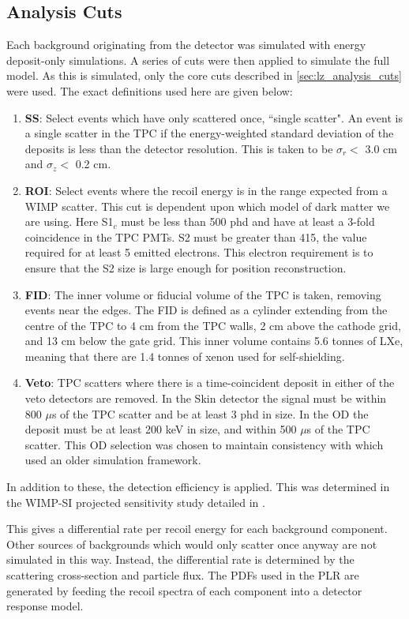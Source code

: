 

\subsection{Analysis Cuts}
\par
Each background originating from the detector was simulated with energy deposit-only simulations.
A series of cuts were then applied to simulate the full model.
As this is simulated, only the core cuts described in \autoref{sec:lz_analysis_cuts} were used.
The exact definitions used here are given below:

\begin{enumerate}
    \item \textbf{SS}: Select events which have only scattered once, ``single scatter". An event is a single scatter in the TPC if the energy-weighted standard deviation of the deposits is less than the detector resolution. This is taken to be $\sigma_r <$ 3.0 cm and $\sigma_z <$ 0.2 cm.
    \item \textbf{ROI}: Select events where the recoil energy is in the range expected from a WIMP scatter. This cut is dependent upon which model of dark matter we are using. Here S1$_c$ must be less than 500 phd and have at least a 3-fold coincidence in the TPC PMTs. S2 must be greater than 415, the value required for at least 5 emitted electrons. This electron requirement is to ensure that the S2 size is large enough for position reconstruction.
    \item \textbf{FID}: The inner volume or fiducial volume of the TPC is taken, removing events near the edges. The FID is defined as a cylinder extending from the centre of the TPC to 4 cm from the TPC walls, 2 cm above the cathode grid, and 13 cm below the gate grid. This inner volume contains 5.6 tonnes of LXe, meaning that there are 1.4 tonnes of xenon used for self-shielding.
    \item \textbf{Veto}: TPC scatters where there is a time-coincident deposit in either of the veto detectors are removed. In the Skin detector the signal must be within 800 $\mu$s of the TPC scatter and be at least 3 phd in size. In the OD the deposit must be at least 200 keV in size, and within 500 $\mu$s of the TPC scatter. This OD selection was chosen to maintain consistency with \cite{LZ_projected_sensitivity_paper_ref} which used an older simulation framework.
\end{enumerate}
In addition to these, the detection efficiency is applied.
This was determined in the WIMP-SI projected sensitivity study detailed in \cite{LZ_projected_sensitivity_paper_ref}.
\par
This gives a differential rate per recoil energy for each background component.
Other sources of backgrounds which would only scatter once anyway are not simulated in this way.
Instead, the differential rate is determined by the scattering cross-section and particle flux.
The PDFs used in the PLR are generated by feeding the recoil spectra of each component into a detector response model.

